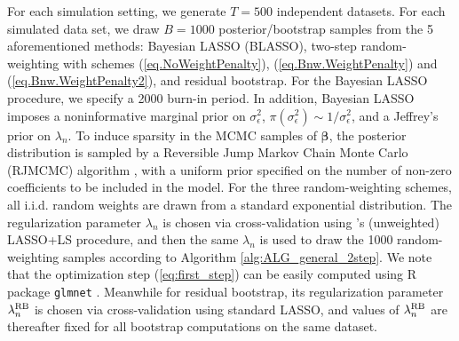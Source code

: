 \documentclass[ejs,authoryear,linksfromyear]{imsart}
\numberwithin{equation}{section}
\theoremstyle{plain}
\begin{document}
For each simulation setting, we generate $T=500$ independent datasets. For each simulated data set, we draw $B=1000$ posterior/bootstrap samples from the 5 aforementioned methods: Bayesian LASSO (BLASSO), two-step random-weighting with schemes (\ref{eq.NoWeightPenalty}), (\ref{eq.Bnw.WeightPenalty}) and (\ref{eq.Bnw.WeightPenalty2}), and residual bootstrap. For the Bayesian LASSO procedure, we specify a 2000 burn-in period. In addition, Bayesian LASSO imposes a noninformative marginal prior on $\sigma^2_\epsilon$, $\pi(\sigma^2_\epsilon) \sim 1/\sigma^2_\epsilon$, and a Jeffrey's prior on $\lambda_n$. To induce sparsity in the MCMC samples of $\bm{\beta}$, the posterior distribution is sampled by a Reversible Jump Markov Chain Monte Carlo (RJMCMC) algorithm \citep{rjmcmc}, with a uniform prior specified on the number of non-zero coefficients to be included in the model. For the three random-weighting schemes, all i.i.d. random weights are drawn from a standard exponential distribution. The regularization parameter $\lambda_n$ is chosen via cross-validation using \citet{Liu&Yu}'s (unweighted) LASSO+LS procedure, and then the same $\lambda_n$ is used to draw the 1000 random-weighting samples according to Algorithm \ref{alg:ALG_general_2step}. We note that the optimization step (\ref{eq:first_step}) can be easily computed using R package \texttt{glmnet} \citep{glmnet}. Meanwhile for residual bootstrap, its regularization parameter $\lambda_n^{\rm RB}$ is chosen via cross-validation using standard LASSO, and values of $\lambda_n^{\rm RB}$ are thereafter fixed for all bootstrap computations on the same dataset. 
\end{document}
